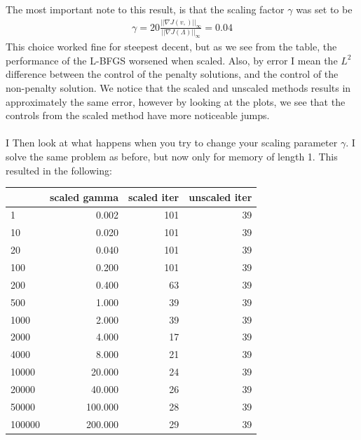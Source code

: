 \documentclass[11pt,a4paper]{article}
\begin{document}
The most important note to this result, is that the scaling factor $\gamma$ was set to be 
\begin{align*}
\gamma = 20\frac{||\nabla J(v,)||_{\infty}}{||\nabla J(\Lambda)||_{\infty}}=0.04
\end{align*}
This choice worked fine for steepest decent, but as we see from the table, the performance of the L-BFGS worsened when scaled. Also, by error I mean the $L^2$ difference between the control of the penalty solutions, and the control of the non-penalty solution. We notice that the scaled and unscaled methods results in approximately the same error, however by looking at the plots, we see that the controls from the scaled method have more noticeable jumps.
\\
\\
I Then look at what happens when you try to change your scaling parameter $\gamma$. I solve the same problem as before, but now only for memory of length 1. This resulted in the following:
\\
\begin{tabular}{lrrr}
\toprule
{} &  scaled gamma &  scaled iter &  unscaled iter \\
\midrule
1      &         0.002 &          101 &             39 \\
10     &         0.020 &          101 &             39 \\
20     &         0.040 &          101 &             39 \\
100    &         0.200 &          101 &             39 \\
200    &         0.400 &           63 &             39 \\
500    &         1.000 &           39 &             39 \\
1000   &         2.000 &           39 &             39 \\
2000   &         4.000 &           17 &             39 \\
4000   &         8.000 &           21 &             39 \\
10000  &        20.000 &           24 &             39 \\
20000  &        40.000 &           26 &             39 \\
50000  &       100.000 &           28 &             39 \\
100000 &       200.000 &           29 &             39 \\
\bottomrule
\end{tabular}
\end{document}

